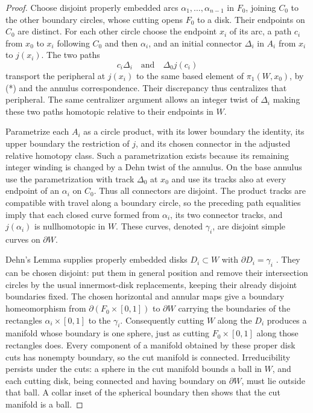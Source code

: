 \documentclass[11pt]{article}
\numberwithin{equation}{section}
\theoremstyle{definition}
\theoremstyle{remark}
\begin{document}
\begin{proof}
Choose disjoint properly embedded arcs $\alpha_1,\ldots,\alpha_{n-1}$
in $F_0$, joining $C_0$ to the other boundary circles, whose cutting
opens $F_0$ to a disk.  Their endpoints on $C_0$ are distinct.
For each other circle choose the endpoint $x_i$ of its arc, a path
$c_i$ from $x_0$ to $x_i$ following $C_0$ and then $\alpha_i$, and an
initial connector $\Delta_i$ in $A_i$ from $x_i$ to $j(x_i)$.
The two paths
\[
 c_i\Delta_i\quad\text{and}\quad\Delta_0j(c_i)
\]
transport the peripheral at $j(x_i)$ to the same based element of
$\pi_1(W,x_0)$, by (*) and the annulus correspondence.
Their discrepancy thus centralizes that peripheral.  The same
centralizer argument allows an integer twist of $\Delta_i$ making
these two paths homotopic relative to their endpoints in $W$.

Parametrize each $A_i$ as a circle product, with its lower boundary
the identity, its upper boundary the restriction of $j$, and its
chosen connector in the adjusted relative homotopy class.  Such a
parametrization exists because its remaining integer winding is
changed by a Dehn twist of the annulus.  On the base annulus use the
parametrization with track $\Delta_0$ at $x_0$ and use its tracks also
at every endpoint of an $\alpha_i$ on $C_0$.  Thus all connectors are
disjoint.  The product tracks are compatible with travel along a
boundary circle, so the preceding path equalities imply that each
closed curve formed from $\alpha_i$, its two connector tracks, and
$j(\alpha_i)$ is nullhomotopic in $W$.  These curves, denoted $\gamma_i$,
are disjoint simple curves on $\partial W$.

Dehn's Lemma supplies properly embedded disks $D_i\subset W$ with
$\partial D_i=\gamma_i$ \cite{Papakyriakopoulos1957}.  They can be chosen
disjoint: put them in general position and remove their intersection
circles by the usual innermost-disk replacements, keeping their
already disjoint boundaries fixed.  The chosen horizontal and annular
maps give a boundary homeomorphism from $\partial(F_0\times[0,1])$
to $\partial W$ carrying the boundaries of the rectangles
$\alpha_i\times[0,1]$ to the $\gamma_i$.  Consequently cutting $W$
along the $D_i$ produces a manifold whose boundary is one sphere,
just as cutting $F_0\times[0,1]$ along those rectangles does.
Every component of a manifold obtained by these proper disk cuts has
nonempty boundary, so the cut manifold is connected.  Irreducibility
persists under the cuts: a sphere in the cut manifold bounds a ball
in $W$, and each cutting disk, being connected and having boundary
on $\partial W$, must lie outside that ball.  A collar inset of the
spherical boundary then shows that the cut manifold is a ball.


\end{proof}
\end{document}
